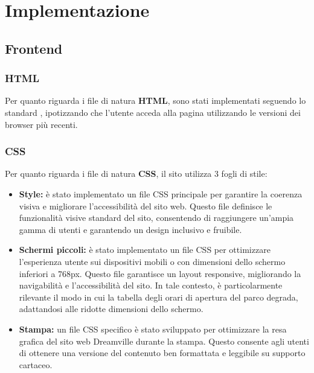 \section{Implementazione}
\subsection{Frontend}
\subsubsection{HTML}
Per quanto riguarda i file di natura \textbf{HTML}, sono stati implementati seguendo lo standard , ipotizzando che l'utente acceda alla pagina utilizzando le versioni dei browser più recenti.

\subsubsection{CSS}
Per quanto riguarda i file di natura \textbf{CSS}, il sito utilizza 3 fogli di stile:
\begin{itemize}
    \item \textbf{Style:} è stato implementato un file CSS principale per garantire la coerenza visiva e migliorare l'accessibilità del sito web. Questo file definisce le funzionalità visive standard del sito, consentendo di raggiungere un'ampia gamma di utenti e garantendo un design inclusivo e fruibile.
    \item \textbf{Schermi piccoli:} è stato implementato un file CSS per ottimizzare l'esperienza utente sui dispositivi mobili o con dimensioni dello schermo inferiori a 768px. Questo file garantisce un layout responsive, migliorando la navigabilità e l'accessibilità del sito. In tale contesto, è particolarmente rilevante il modo in cui la tabella degli orari di apertura del parco degrada, adattandosi alle ridotte dimensioni dello schermo.
    \item \textbf{Stampa:} un file CSS specifico è stato sviluppato per ottimizzare la resa grafica del sito web Dreamville durante la stampa. Questo consente agli utenti di ottenere una versione del contenuto ben formattata e leggibile su supporto cartaceo.
\end{itemize}


